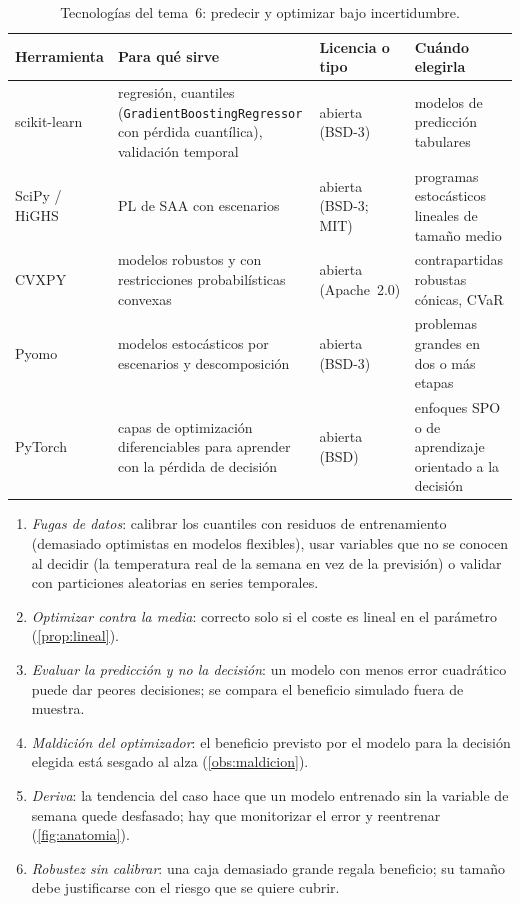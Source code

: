 \begin{table}[h]
\centering\small
\caption{Tecnologías del tema~6: predecir y optimizar bajo incertidumbre.}\label{tab:tec6}
\begin{tabularx}{\textwidth}{@{}l>{\raggedright\arraybackslash}X>{\raggedright\arraybackslash}p{2.2cm}>{\raggedright\arraybackslash}X@{}}
\toprule
Herramienta & Para qué sirve & Licencia o tipo & Cuándo elegirla \\
\midrule
scikit-learn & regresión, cuantiles (\texttt{GradientBoostingRegressor} con pérdida cuantílica), validación temporal & abierta (BSD-3) & modelos de predicción tabulares \\
SciPy / HiGHS & PL de SAA con escenarios & abierta (BSD-3; MIT) & programas estocásticos lineales de tamaño medio \\
CVXPY~\cite{cvxpy} & modelos robustos y con restricciones probabilísticas convexas & abierta (Apache~2.0) & contrapartidas robustas cónicas, CVaR \\
Pyomo & modelos estocásticos por escenarios y descomposición & abierta (BSD-3) & problemas grandes en dos o más etapas \\
PyTorch & capas de optimización diferenciables para aprender con la pérdida de decisión & abierta (BSD) & enfoques SPO o de aprendizaje orientado a la decisión \\
\bottomrule
\end{tabularx}
\end{table}

\begin{observacion}\label{obs:errores6}
\begin{enumerate}[label=(\alph*)]
  \item \emph{Fugas de datos}: calibrar los cuantiles con residuos de entrenamiento (demasiado optimistas en modelos flexibles), usar variables que no se conocen al decidir (la temperatura real de la semana en vez de la previsión) o validar con particiones aleatorias en series temporales.
  \item \emph{Optimizar contra la media}: correcto solo si el coste es lineal en el parámetro (\cref{prop:lineal}).
  \item \emph{Evaluar la predicción y no la decisión}: un modelo con menos error cuadrático puede dar peores decisiones; se compara el beneficio simulado fuera de muestra.
  \item \emph{Maldición del optimizador}: el beneficio previsto por el modelo para la decisión elegida está sesgado al alza (\cref{obs:maldicion}).
  \item \emph{Deriva}: la tendencia del caso hace que un modelo entrenado sin la variable de semana quede desfasado; hay que monitorizar el error y reentrenar (\cref{fig:anatomia}).
  \item \emph{Robustez sin calibrar}: una caja demasiado grande regala beneficio; su tamaño debe justificarse con el riesgo que se quiere cubrir.
\end{enumerate}
\end{observacion}

